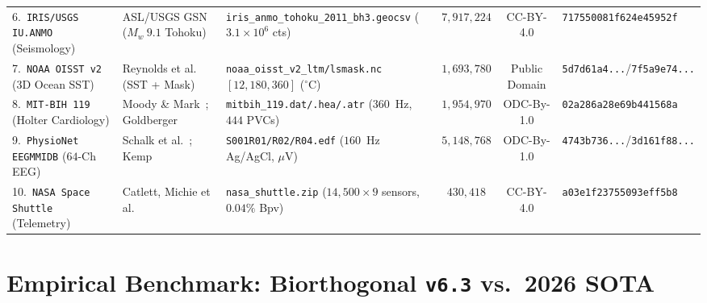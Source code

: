 \documentclass[10pt,twocolumn]{article}
\begin{document}
\begin{table}[t]
{\begin{tabular}{lllccl}
6.\ \texttt{IRIS/USGS IU.ANMO} (Seismology) & ASL/USGS GSN~\citep{asl1988gsn} ($M_w~9.1$ Tohoku) & \texttt{iris\_anmo\_tohoku\_2011\_bh3.geocsv} ($3.1\times 10^6$ cts) & $7{,}917{,}224$ & CC-BY-4.0 & \texttt{717550081f624e45952f} \\
7.\ \texttt{NOAA OISST v2} (3D Ocean SST) & Reynolds et al.~\citep{reynolds2002improved} (SST + Mask) & \texttt{noaa\_oisst\_v2\_ltm/lsmask.nc} $[12,180,360]$ ($^\circ$C) & $1{,}693{,}780$ & Public Domain & \texttt{5d7d61a4...}/\texttt{7f5a9e74...} \\
8.\ \texttt{MIT-BIH 119} (Holter Cardiology) & Moody \& Mark~\citep{moody2001impact}; Goldberger~\citep{goldberger2000physionet} & \texttt{mitbih\_119.dat/.hea/.atr} ($360$~Hz, $444$ PVCs) & $1{,}954{,}970$ & ODC-By-1.0 & \texttt{02a286a28e69b441568a} \\
9.\ \texttt{PhysioNet EEGMMIDB} ($64$-Ch EEG) & Schalk et al.~\citep{schalk2004bci2000}; Kemp~\citep{kemp1992edf} & \texttt{S001R01/R02/R04.edf} ($160$~Hz Ag/AgCl, $\mu$V) & $5{,}148{,}768$ & ODC-By-1.0 & \texttt{4743b736...}/\texttt{3d161f88...} \\
10.\ \texttt{NASA Space Shuttle} (Telemetry) & Catlett, Michie et al.~\citep{michie1994statlog} & \texttt{nasa\_shuttle.zip} ($14{,}500\times 9$ sensors, $0.04\%$ Bpv) & $430{,}418$ & CC-BY-4.0 & \texttt{a03e1f23755093eff5b8} \\
\bottomrule
\end{tabular}%
}
\end{table}

\section{Empirical Benchmark: Biorthogonal \texttt{v6.3} vs.\ 2026 SOTA}
\end{document}
